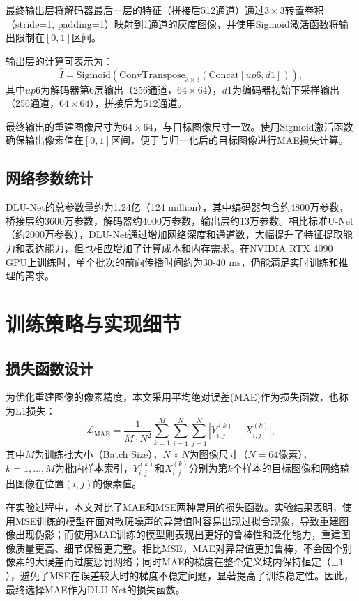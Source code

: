 {最终输出层将解码器最后一层的特征（拼接后512通道）通过$3\times3$转置卷积（stride=1, padding=1）映射到1通道的灰度图像，并使用Sigmoid激活函数将输出限制在$[0, 1]$区间。

输出层的计算可表示为：
\begin{equation}
\hat{I} = \text{Sigmoid}(\text{ConvTranspose}_{3\times3}(\text{Concat}[up6, d1])),
\end{equation}
其中$up6$为解码器第6层输出（256通道，$64\times64$），$d1$为编码器初始下采样输出（256通道，$64\times64$），拼接后为512通道。

最终输出的重建图像尺寸为$64\times64$，与目标图像尺寸一致。使用Sigmoid激活函数确保输出像素值在$[0, 1]$区间，便于与归一化后的目标图像进行MAE损失计算。

\subsection{网络参数统计}\label{sec:network_parameters}

DLU-Net的总参数量约为1.24亿（124 million），其中编码器包含约4800万参数，桥接层约3600万参数，解码器约4000万参数，输出层约13万参数。相比标准U-Net（约2000万参数），DLU-Net通过增加网络深度和通道数，大幅提升了特征提取能力和表达能力，但也相应增加了计算成本和内存需求。在NVIDIA RTX 4090 GPU上训练时，单个批次的前向传播时间约为30-40 ms，仍能满足实时训练和推理的需求。

\section{训练策略与实现细节}\label{sec:training_details}

\subsection{损失函数设计}\label{sec:loss_function}

为优化重建图像的像素精度，本文采用平均绝对误差(MAE)作为损失函数，也称为L1损失：
\begin{equation}
\mathcal{L}_{\text{MAE}} = \frac{1}{M \cdot N^2} \sum_{k=1}^{M} \sum_{i=1}^{N} \sum_{j=1}^{N} |Y_{i,j}^{(k)} - X_{i,j}^{(k)}|,
\end{equation}
其中$M$为训练批大小（Batch Size），$N \times N$为图像尺寸（$N = 64$像素），$k = 1, \ldots, M$为批内样本索引，$Y_{i,j}^{(k)}$和$X_{i,j}^{(k)}$分别为第$k$个样本的目标图像和网络输出图像在位置$(i,j)$的像素值。

在实验过程中，本文对比了MAE和MSE两种常用的损失函数。实验结果表明，使用MSE训练的模型在面对散斑噪声的异常值时容易出现过拟合现象，导致重建图像出现伪影；而使用MAE训练的模型则表现出更好的鲁棒性和泛化能力，重建图像质量更高、细节保留更完整。相比MSE，MAE对异常值更加鲁棒，不会因个别像素的大误差而过度惩罚网络；同时MAE的梯度在整个定义域内保持恒定（$\pm 1$），避免了MSE在误差较大时的梯度不稳定问题，显著提高了训练稳定性。因此，最终选择MAE作为DLU-Net的损失函数。

}
